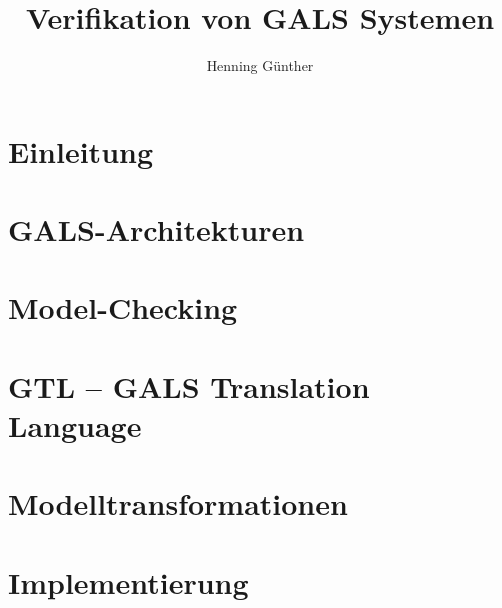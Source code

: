 \documentclass[10pt]{scrbook}
\title{Verifikation von GALS Systemen}
\author{Henning Günther}
\begin{document}
\maketitle

\tableofcontents

\chapter{Einleitung}

\chapter{GALS-Architekturen}

\chapter{Model-Checking}


\chapter{GTL -- GALS Translation Language}

\chapter{Modelltransformationen}


\chapter{Implementierung}







\end{document}
